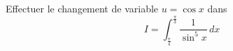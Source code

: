 Effectuer le changement de variable $u=\cos x$ dans
\begin{displaymath}
 I=\int_{\frac{\pi}{4}}^{\frac{\pi}{3}}\frac{1}{\sin^5 x}\,dx
\end{displaymath}
\bigskip \bigskip
